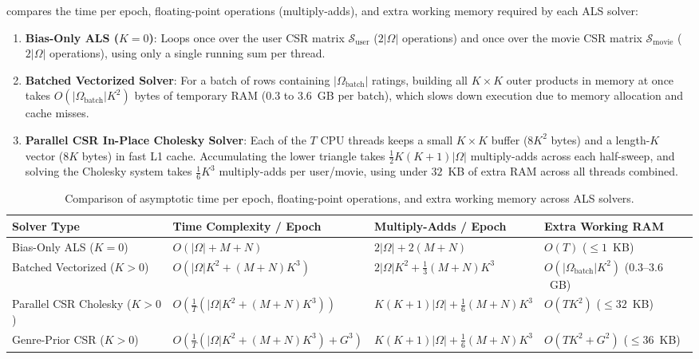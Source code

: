 \documentclass{article}
\theoremstyle{plain}
\theoremstyle{definition}
\begin{document}
 compares the time per epoch, floating-point operations (multiply-adds), and extra working memory required by each ALS solver:
\begin{enumerate}
    \item \textbf{Bias-Only ALS ($K=0$)}: Loops once over the user CSR matrix $\mathcal{S}_{\text{user}}$ ($2|\Omega|$ operations) and once over the movie CSR matrix $\mathcal{S}_{\text{movie}}$ ($2|\Omega|$ operations), using only a single running sum per thread.
    \item \textbf{Batched Vectorized Solver}: For a batch of rows containing $|\Omega_{\text{batch}}|$ ratings, building all $K \times K$ outer products in memory at once takes $O(|\Omega_{\text{batch}}| K^2)$ bytes of temporary RAM ($0.3$ to $3.6$~GB per batch), which slows down execution due to memory allocation and cache misses.
    \item \textbf{Parallel CSR In-Place Cholesky Solver}: Each of the $T$ CPU threads keeps a small $K \times K$ buffer ($8 K^2$ bytes) and a length-$K$ vector ($8 K$ bytes) in fast L1 cache. Accumulating the lower triangle takes $\frac{1}{2} K(K+1) |\Omega|$ multiply-adds across each half-sweep, and solving the Cholesky system takes $\frac{1}{6} K^3$ multiply-adds per user/movie, using under $32$~KB of extra RAM across all threads combined.
\end{enumerate}

\begin{table}[h]
\caption{Comparison of asymptotic time per epoch, floating-point operations, and extra working memory across ALS solvers.}
\label{tab:app_complexity}
\vskip 0.1in
\begin{center}
\begin{scriptsize}
\setlength{\tabcolsep}{4pt}
\begin{tabular}{llll}
\toprule
\textbf{Solver Type} & \textbf{Time Complexity / Epoch} & \textbf{Multiply-Adds / Epoch} & \textbf{Extra Working RAM} \\
\midrule
Bias-Only ALS ($K=0$) & $O(|\Omega| + M + N)$ & $2|\Omega| + 2(M+N)$ & $O(T)$ ($\le 1$~KB) \\
Batched Vectorized ($K>0$) & $O(|\Omega| K^2 + (M+N) K^3)$ & $2|\Omega| K^2 + \frac{1}{3}(M+N) K^3$ & $O(|\Omega_{\text{batch}}| K^2)$ ($0.3\text{--}3.6$~GB) \\
Parallel CSR Cholesky ($K>0$) & $O\!\left(\tfrac{1}{T}(|\Omega| K^2 + (M+N) K^3)\right)$ & $K(K+1)|\Omega| + \frac{1}{6}(M+N) K^3$ & $O(T K^2)$ ($\le 32$~KB) \\
Genre-Prior CSR ($K>0$) & $O\!\left(\tfrac{1}{T}(|\Omega| K^2 + (M+N) K^3) + G^3\right)$ & $K(K+1)|\Omega| + \frac{1}{6}(M+N) K^3$ & $O(T K^2 + G^2)$ ($\le 36$~KB) \\
\bottomrule
\end{tabular}
\end{scriptsize}
\end{center}
\end{table}
\end{document}
